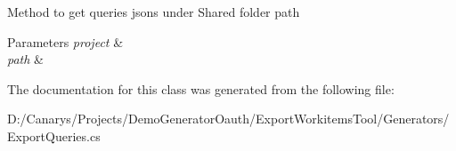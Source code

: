 Method to get queries jsons under Shared folder path 


\begin{DoxyParams}{Parameters}
{\em project} & \\
\hline
{\em path} & \\
\hline
\end{DoxyParams}


The documentation for this class was generated from the following file\+:\begin{DoxyCompactItemize}
\item 
D\+:/\+Canarys/\+Projects/\+Demo\+Generator\+Oauth/\+Export\+Workitems\+Tool/\+Generators/Export\+Queries.\+cs\end{DoxyCompactItemize}
